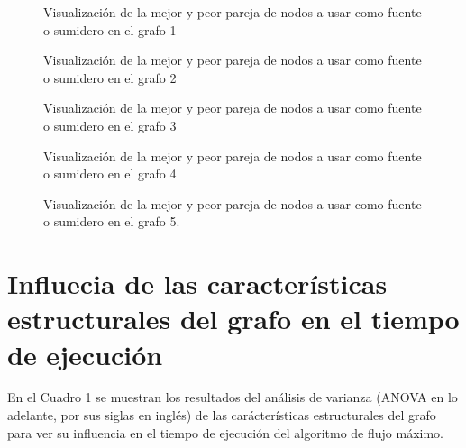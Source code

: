 \documentclass{article}
\begin{document}
\begin{figure}[htbp]
\caption{Visualización de la mejor y peor pareja de nodos a usar como fuente o sumidero en el grafo 1}
\label{Flujo1} 
\end{figure}

\begin{figure}[htbp]
\caption{Visualización de la mejor y peor pareja de nodos a usar como fuente o sumidero en el grafo 2}
\label{Flujo2} 
\end{figure}

\begin{figure}[htbp]
\caption{Visualización de la mejor y peor pareja de nodos a usar como fuente o sumidero en el grafo 3}
\label{Flujo3} 
\end{figure}

\begin{figure}[htbp]
\caption{Visualización de la mejor y peor pareja de nodos a usar como fuente o sumidero en el grafo 4}
\label{Flujo4} 
\end{figure}


\begin{figure}[htbp]
\caption{Visualización de la mejor y peor pareja de nodos a usar como fuente o sumidero en el grafo 5.}
\label{Flujo5} 
\end{figure}

\section*{Influecia de las características estructurales del grafo en el tiempo de ejecución}


En el Cuadro 1 se muestran los resultados del análisis de varianza (ANOVA en lo adelante, por sus siglas en inglés) de las carácterísticas estructurales del grafo para ver su influencia en el tiempo de ejecución del algoritmo de flujo máximo.
\end{document}

